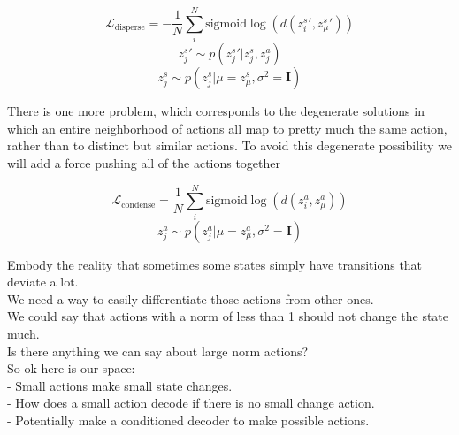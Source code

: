 \documentclass{article}
\begin{document}
$$\mathcal{L}_\text{disperse} = -\frac{1}{N}\sum\limits_i^N \text{sigmoid}\log(d({z^s_i}', {z^s_\mu}'))$$
$${z^s_j}' \sim p({z^s_j}'|z^s_j,z^a_j)$$
$$z^s_j \sim p(z^s_j | \mu=z^s_\mu, \sigma^2=\mathbf{I})$$


There is one more problem, which corresponds to the degenerate solutions in which an entire neighborhood of actions all map to pretty much the same action, rather than to distinct but similar actions.
To avoid this degenerate possibility we will add a force pushing all of the actions together

$$\mathcal{L}_\text{condense} = \frac{1}{N}\sum\limits_i^N \text{sigmoid}\log(d({z^a_i}, {z^a_\mu}))$$
$$z^a_j \sim p(z^a_j | \mu=z^a_\mu, \sigma^2=\mathbf{I})$$



Embody the reality that sometimes some states simply have transitions that deviate a lot.\\
We need a way to easily differentiate those actions from other ones.\\
We could say that actions with a norm of less than 1 should not change the state much.\\
Is there anything we can say about large norm actions?\\

So ok here is our space:\\

- Small actions make small state changes.\\
- How does a small action decode if there is no small change action.\\
- Potentially make a conditioned decoder to make possible actions.
\end{document}
